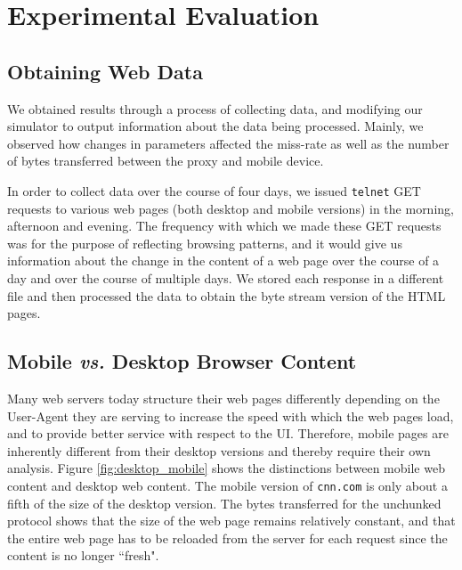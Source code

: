 \section{Experimental Evaluation}
\label{sec:eval}

\subsection{Obtaining Web Data}
We obtained results through a process of collecting data, and modifying our simulator to output information about the data being processed. 
Mainly, we observed how changes in parameters affected the miss-rate as well as the number of bytes transferred between the proxy and mobile device.
 
In order to collect data over the course of four days, we issued \texttt{telnet} GET requests to various web pages (both desktop and mobile versions) in the morning, afternoon and evening. 
The frequency with which we made these GET requests was for the purpose of reflecting browsing patterns, and it would give us information about the change in the content of a web page over the course of a day and over the course of multiple days. 
We stored each response in a different file and then processed the data to obtain the byte stream version of the HTML pages.

\subsection{Mobile \textit{vs.} Desktop Browser Content}
Many web servers today structure their web pages differently depending on the User-Agent they are serving to increase the speed with which the web pages load, and to provide better service with respect to the UI. 
Therefore, mobile pages are inherently different from their desktop versions and thereby require their own analysis. 
Figure \ref{fig:desktop_mobile} shows the distinctions between mobile web content and desktop web content. The mobile version of \texttt{cnn.com} is only about a fifth of the size of the desktop version. 
The bytes transferred for the unchunked protocol shows that the size of the web page remains relatively constant, and that the entire web page has to be reloaded from the server for each request since the content is no longer ``fresh". 

